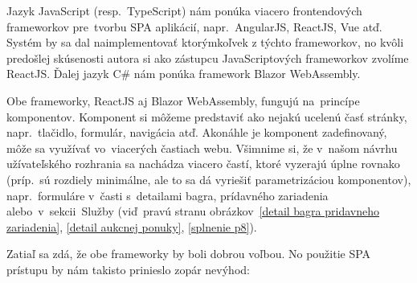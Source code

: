 Jazyk JavaScript (resp.~TypeScript) nám ponúka viacero frontendových frameworkov pre~tvorbu SPA aplikácií, napr.~AngularJS, ReactJS, Vue atď. Systém by sa dal naimplementovať ktorýmkoľvek z týchto frameworkov, no kvôli predošlej skúsenosti autora si ako zástupcu JavaScriptových frameworkov zvolíme ReactJS. Ďalej jazyk C\# nám ponúka framework Blazor WebAssembly.

Obe frameworky, ReactJS aj Blazor WebAssembly, fungujú na~princípe komponentov. Komponent si môžeme predstaviť ako nejakú ucelenú časť stránky, napr.~tlačidlo, formulár, navigácia atď. Akonáhle je komponent zadefinovaný, môže sa využívať vo~viacerých častiach webu. Všimnime si, že v~našom návrhu užívateľského rozhrania sa nachádza viacero častí, ktoré vyzerajú úplne rovnako (príp.~sú rozdiely minimálne, ale to sa dá vyriešiť parametrizáciou komponentov), napr.~formuláre v~časti s~detailami bagra, prídavného zariadenia alebo~v~sekcii~Služby (viď~pravú stranu obrázkov~\ref{detail bagra pridavneho zariadenia}, \ref{detail aukcnej ponuky}, \ref{splnenie p8}).

Zatiaľ sa zdá, že obe frameworky by boli dobrou voľbou. No použitie SPA prístupu by nám takisto prinieslo zopár nevýhod:

